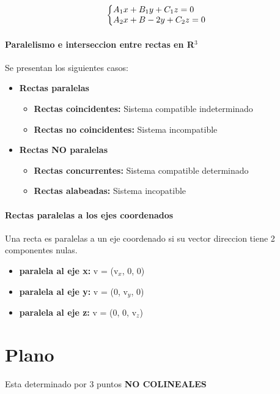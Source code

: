 \documentclass[11pt]{article}
\begin{document}
\begin{equation*}
  \left\{
    \begin{array}{@{} l c @{}}
      A_1x + B_1y + C_1z = 0 \\
	A_2x + B-2y + C_2z = 0	
    \end{array}\right.
\end{equation*}

\paragraph{Paralelismo e interseccion entre rectas en R$^3$}
Se presentan los siguientes casos:
\begin{itemize}
	\item \textbf{Rectas paralelas}
	\begin{itemize}
		\item \textbf{Rectas coincidentes: } Sistema compatible indeterminado
		\item \textbf{Rectas no coincidentes: } Sistema incompatible
	\end{itemize}
	\item \textbf{Rectas NO paralelas}
	\begin{itemize}
		\item \textbf{Rectas concurrentes: }Sistema compatible determinado
		\item \textbf{Rectas alabeadas: }Sistema incopatible
	\end{itemize}
\end{itemize}
\paragraph{Rectas paralelas a los ejes coordenados}
Una recta es paralelas a un eje coordenado si su vector direccion tiene 2 componentes nulas.
\begin{itemize}
	\item \textbf{paralela al eje x:} v = (v$_x$, 0, 0)
	\item \textbf{paralela al eje y:} v = (0, v$_y$, 0)
	\item \textbf{paralela al eje z:} v = (0, 0, v$_z$)
\end{itemize}
\section{Plano}
Esta determinado por 3 puntos \textbf{NO COLINEALES}
\end{document}
